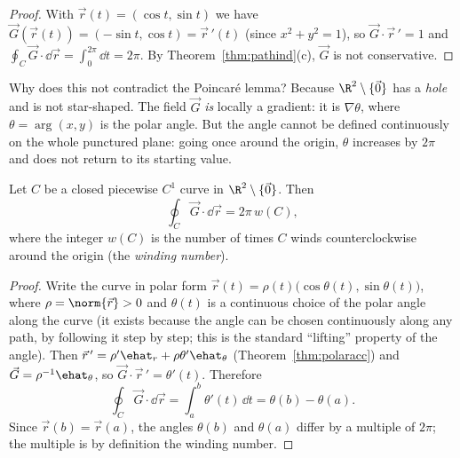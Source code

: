 \begin{proof}
With $\vec r(t)=(\cos t,\sin t)$ we have $\vec G(\vec r(t))=(-\sin t,\cos t)=\vec r\,'(t)$ (since $x^2+y^2=1$), so $\vec G\cdot\vec r\,'=1$ and $\oint_C\vec G\cdot\dd\vec r=\int_0^{2\pi}\dd t=2\pi$. By Theorem~\ref{thm:pathind}(c), $\vec G$ is not conservative.
\end{proof}

Why does this not contradict the Poincar\'e lemma? Because $\R^2\setminus\{\vec 0\}$ has a \emph{hole} and is not star-shaped. The field $\vec G$ \emph{is} locally a gradient: it is $\nabla\theta$, where $\theta=\arg(x,y)$ is the polar angle. But the angle cannot be defined continuously on the whole punctured plane: going once around the origin, $\theta$ increases by $2\pi$ and does not return to its starting value.

\begin{theorem}\label{thm:winding}
Let $C$ be a closed piecewise $C^1$ curve in $\R^2\setminus\{\vec 0\}$. Then
\[
\oint_C\vec G\cdot\dd\vec r=2\pi\,w(C),
\]
where the integer $w(C)$ is the number of times $C$ winds counterclockwise around the origin (the \emph{winding number}).
\end{theorem}

\begin{proof}
Write the curve in polar form $\vec r(t)=\rho(t)\bigl(\cos\theta(t),\sin\theta(t)\bigr)$, where $\rho=\norm{\vec r}>0$ and $\theta(t)$ is a continuous choice of the polar angle along the curve (it exists because the angle can be chosen continuously along any path, by following it step by step; this is the standard ``lifting'' property of the angle). Then $\vec r\,'=\rho'\ehat_r+\rho\theta'\ehat_\theta$ (Theorem~\ref{thm:polaracc}) and $\vec G=\rho^{-1}\ehat_\theta$, so $\vec G\cdot\vec r\,'=\theta'(t)$. Therefore
\[
\oint_C\vec G\cdot\dd\vec r=\int_a^b\theta'(t)\,\dd t=\theta(b)-\theta(a).
\]
Since $\vec r(b)=\vec r(a)$, the angles $\theta(b)$ and $\theta(a)$ differ by a multiple of $2\pi$; the multiple is by definition the winding number.
\end{proof}

